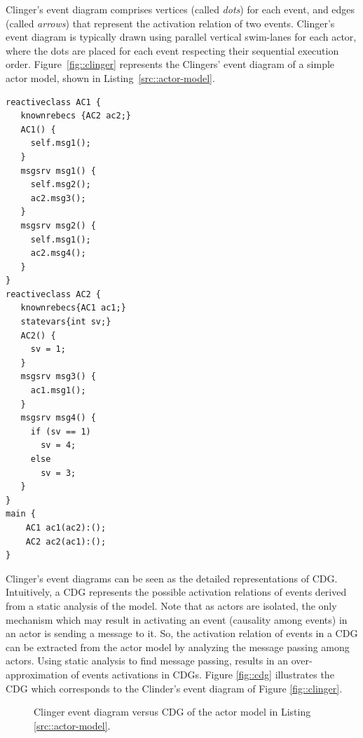 Clinger's event diagram comprises vertices (called \emph{dots}) for each event, and edges (called \emph{arrows}) that represent the activation relation of two events. Clinger's event diagram is typically drawn using parallel vertical swim-lanes for each actor, where the dots are placed for each event respecting their sequential execution order. Figure~\ref{fig::clinger} represents the Clingers' event diagram of a simple actor model, shown in Listing~\ref{src::actor-model}. 

\begin{lstlisting}[language=rebeca, caption= A simple actor model, label=src::actor-model]
reactiveclass AC1 {
   knownrebecs {AC2 ac2;}
   AC1() {
     self.msg1();
   }
   msgsrv msg1() {
     self.msg2();
     ac2.msg3();
   }
   msgsrv msg2() {
     self.msg1();
     ac2.msg4();
   }
}
reactiveclass AC2 {
   knownrebecs{AC1 ac1;}
   statevars{int sv;}
   AC2() {
     sv = 1;
   }
   msgsrv msg3() {
     ac1.msg1();
   }
   msgsrv msg4() {
     if (sv == 1)
       sv = 4;
     else
       sv = 3;
   }
}
main {
    AC1 ac1(ac2):();
    AC2 ac2(ac1):();
}
\end{lstlisting}

Clinger's event diagrams can be seen as the detailed representations of CDG. Intuitively, a CDG represents the possible activation relations of events derived from a static analysis of the model. Note that as actors are isolated, the only mechanism which may result in activating an event (causality among events) in an actor is sending a message to it. So, the activation relation of events in a CDG can be extracted from the %
actor model by analyzing the message passing among actors. Using static analysis to find message passing, results in an over-approximation of events activations in CDGs. Figure \ref{fig::cdg} illustrates the CDG which corresponds to the Clinder's event diagram of Figure \ref{fig::clinger}.

\begin{figure}
\centering
{}
\qquad
{}
\caption{Clinger event diagram versus CDG of the actor model in Listing \ref{src::actor-model}.}
\label{fig::clinger-cdg}
\end{figure}

